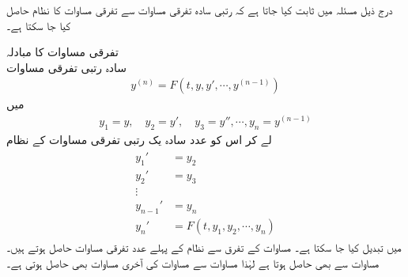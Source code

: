 درج ذیل مسئلہ میں ثابت کیا جاتا ہے کہ  رتبی سادہ تفرقی مساوات  سے تفرقی مساوات کا نظام حاصل کیا جا سکتا ہے۔

\quad تفرقی مساوات کا مبادلہ\\
سادہ  رتبی تفرقی مساوات
\begin{align}\label{مساوات_بلند_درجی_سے_سادہ_الف}
y^{(n)}=F(t,y,y',\cdots,y^{(n-1)})
\end{align}
میں
\begin{align}\label{مساوات_بلند_درجی_سے_سادہ_ب}
y_1=y,\quad y_2=y',\quad y_3=y'', \cdots, y_n=y^{(n-1)}
\end{align}
لے کر اس کو   عدد سادہ یک رتبی تفرقی مساوات کے نظام
\begin{gather}
\begin{aligned}\label{مساوات_بلند_درجی_سے_سادہ_پ}
y_1'&=y_2\\
y_2'&=y_3\\
\vdots\\
y_{n-1}'&=y_n\\
y_n'&=F(t,y_1,y_2,\cdots,y_n)
\end{aligned}
\end{gather}
 میں تبدیل کیا جا سکتا ہے۔
مساوات  کے تفرق سے نظام کے پہلے  عدد تفرقی مساوات حاصل ہوتے ہیں۔مساوات  سے  بھی حاصل ہوتا ہے لہٰذا مساوات  سے مساوات  کی آخری مساوات بھی حاصل ہوتی ہے۔

